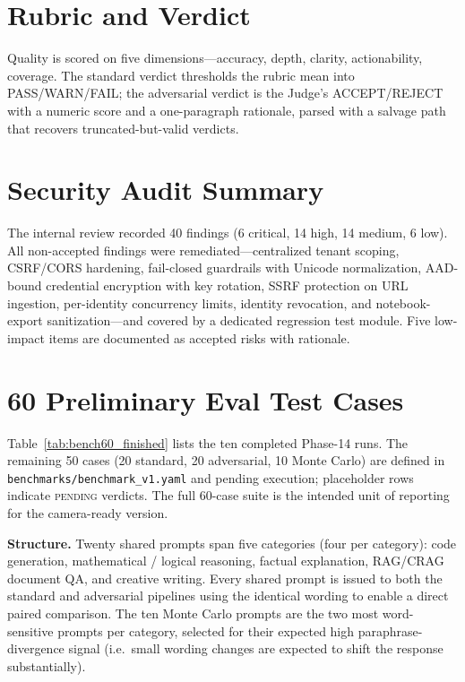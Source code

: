 \documentclass{article}
\begin{document}
\section{Rubric and Verdict}
Quality is scored on five dimensions---accuracy, depth, clarity, actionability, coverage. The
standard verdict thresholds the rubric mean into PASS/WARN/FAIL; the adversarial verdict is
the Judge's ACCEPT/REJECT with a numeric score and a one-paragraph rationale, parsed with a
salvage path that recovers truncated-but-valid verdicts.

\section{Security Audit Summary}
The internal review recorded 40 findings (6 critical, 14 high, 14 medium, 6 low). All
non-accepted findings were remediated---centralized tenant scoping, CSRF/CORS hardening,
fail-closed guardrails with Unicode normalization, AAD-bound credential encryption with key
rotation, SSRF protection on URL ingestion, per-identity concurrency limits, identity
revocation, and notebook-export sanitization---and covered by a dedicated regression test
module. Five low-impact items are documented as accepted risks with rationale.

\section{60 Preliminary Eval Test Cases}
\label{app:bench60}

Table~\ref{tab:bench60_finished} lists the ten completed Phase-14 runs. The remaining 50
cases (20 standard, 20 adversarial, 10 Monte Carlo) are defined in
\texttt{benchmarks/benchmark\_v1.yaml} and pending execution; placeholder rows indicate
\textsc{pending} verdicts. The full 60-case suite is the intended unit of reporting for
the camera-ready version.

\textbf{Structure.} Twenty shared prompts span five categories (four per category):
code generation, mathematical / logical reasoning, factual explanation, RAG/CRAG
document QA, and creative writing. Every shared prompt is issued to both the standard and
adversarial pipelines using the identical wording to enable a direct paired comparison.
The ten Monte Carlo prompts are the two most word-sensitive prompts per category,
selected for their expected high paraphrase-divergence signal (i.e.\ small wording
changes are expected to shift the response substantially).
\end{document}
